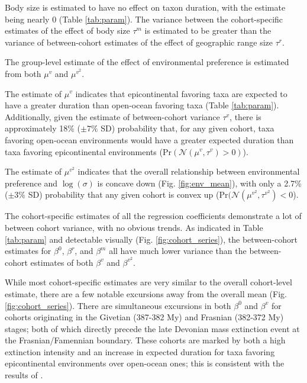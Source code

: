 \documentclass[11pt]{article}
\begin{document}
Body size is estimated to have no effect on taxon duration, with the estimate being nearly 0 (Table \ref{tab:param}). The variance between the cohort-specific estimates of the effect of body size \(\tau^{m}\) is estimated to be greater than the variance of between-cohort estimates of the effect of geographic range size \(\tau^{r}\). 

The group-level estimate of the effect of environmental preference is estimated from both \(\mu^{v}\) and \(\mu^{v^{2}}\). 

The estimate of \(\mu^{v}\) indicates that epicontinental favoring taxa are expected to have a greater duration than open-ocean favoring taxa (Table \ref{tab:param}). Additionally, given the estimate of between-cohort variance \(\tau^{v}\), there is approximately 18\% (\(\pm 7\%\) SD) probability that, for any given cohort, taxa favoring open-ocean environments would have a greater expected duration than taxa favoring epicontinental environments (\(\mathrm{Pr}(\mathcal{N}(\mu^{v}, \tau^{v}) > 0)\)). 

The estimate of \(\mu^{v^{2}}\) indicates that the overall relationship between environmental preference and \(\log(\sigma)\) is concave down (Fig. \ref{fig:env_mean}), with only a 2.7\% (\(\pm 3\%\) SD) probability that any given cohort is convex up (\(\mathrm{Pr}(\mathcal{N}(\mu^{v^{2}}, \tau^{v^{2}}) < 0\)).

The cohort-specific estimates of all the regression coefficients demonstrate a lot of between cohort variance, with no obvious trends. As indicated in Table \ref{tab:param} and detectable visually (Fig. \ref{fig:cohort_series}), the between-cohort estimates for \(\beta^{0}\), \(\beta^{r}\), and \(\beta^{m}\) all have much lower variance than the between-cohort estimates of both \(\beta^{v}\) and \(\beta^{v^{2}}\).

While most cohort-specific estimates are very similar to the overall cohort-level estimate, there are a few notable excursions away from the overall mean (Fig. \ref{fig:cohort_series}). There are simultaneous excursions in both \(\beta^{0}\) and \(\beta^{v}\) for cohorts originating in the Givetian (387-382 My) and Frasnian (382-372 My) stages; both of which directly precede the late Devonian mass extinction event at the Frasnian/Famennian boundary. These cohorts are marked by both a high extinction intensity and an increase in expected duration for taxa favoring epicontinental environments over open-ocean ones; this is consistent with the results of \citet{Miller2009a}.
\end{document}
